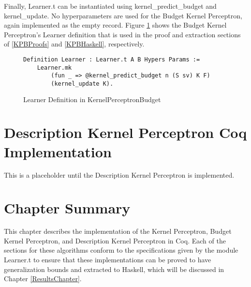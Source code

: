 Finally, Learner.t can be instantiated using kernel\_predict\_budget and kernel\_update. No hyperparameters are used for the Budget Kernel Perceptron, again implemented as the empty record. Figure \ref{kpbLearnerDef} shows the Budget Kernel Perceptron's Learner definition that is used in the proof and extraction sections of \ref{KPBProofs} and \ref{KPBHaskell}, respectively.

\begin{figure}
    \caption{Learner Definition in KernelPerceptronBudget}
    \label{kpbLearnerDef}
    \begin{lstlisting}
Definition Learner : Learner.t A B Hypers Params :=
    Learner.mk
        (fun _ => @kernel_predict_budget n (S sv) K F)
        (kernel_update K).
    \end{lstlisting}
\end{figure}

\section{Description Kernel Perceptron Coq Implementation}\label{KPDCoqImp}
This is a placeholder until the Description Kernel Perceptron is implemented.
\section{Chapter Summary}\label{MethodsChapterSummarySection}
This chapter describes the implementation of the Kernel Perceptron, Budget Kernel Perceptron, and Description Kernel Perceptron in Coq. Each of the sections for these algorithms conform to the specifications given by the module Learner.t to ensure that these implementations can be proved to have generalization bounds and extracted to Haskell, which will be discussed in Chapter \ref{ResultsChapter}. 
